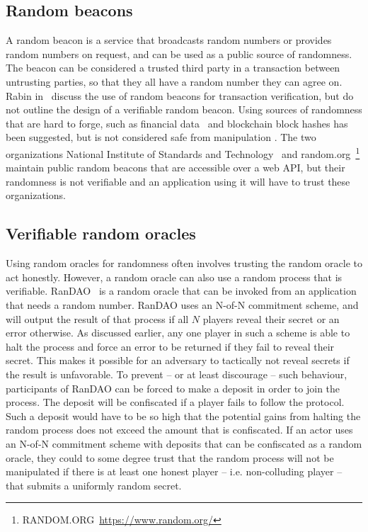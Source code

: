 \subsection{Random beacons}

A random beacon is a service that broadcasts random numbers or provides random numbers on request, and can be used as a public source of randomness. The beacon can be considered a trusted third party in a transaction between untrusting parties, so that they all have a random number they can agree on. Rabin in~\cite{rabin_transaction_1983} discuss the use of random beacons for transaction verification, but do not outline the design of a verifiable random beacon. Using sources of randomness that are hard to forge, such as financial data~\cite{clark_use_2010} and blockchain block hashes \cite{bentov_bitcoin_2016, yajam_improvement_2019} has been suggested, but is not considered safe from manipulation \cite{bonneau_bitcoin_2015, pierrot_malleability_2018}. The two organizations National Institute of Standards and Technology~\cite{nist_nist_2019} and random.org~\footnote{RANDOM.ORG~\url{https://www.random.org/}} maintain public random beacons that are accessible over a web API, but their randomness is not verifiable and an application using it will have to trust these organizations. 

\subsection{Verifiable random oracles}

Using random oracles for randomness often involves trusting the random oracle to act honestly. However, a random oracle can also use a random process that is verifiable. RanDAO~\cite{randao2015randao} is a random oracle that can be invoked from an application that needs a random number. RanDAO uses an N-of-N commitment scheme, and will output the result of that process if all $N$ players reveal their secret or an error otherwise. As discussed earlier, any one player in such a scheme is able to halt the process and force an error to be returned if they fail to reveal their secret. This makes it possible for an adversary to tactically not reveal secrets if the result is unfavorable. To prevent – or at least discourage – such behaviour, participants of RanDAO can be forced to make a deposit in order to join the process. The deposit will be confiscated if a player fails to follow the protocol. Such a deposit would have to be so high that the potential gains from halting the random process does not exceed the amount that is confiscated. If an actor uses an N-of-N commitment scheme with deposits that can be confiscated as a random oracle, they could to some degree trust that the random process will not be manipulated if there is at least one honest player – i.e. non-colluding player – that submits a uniformly random secret.

